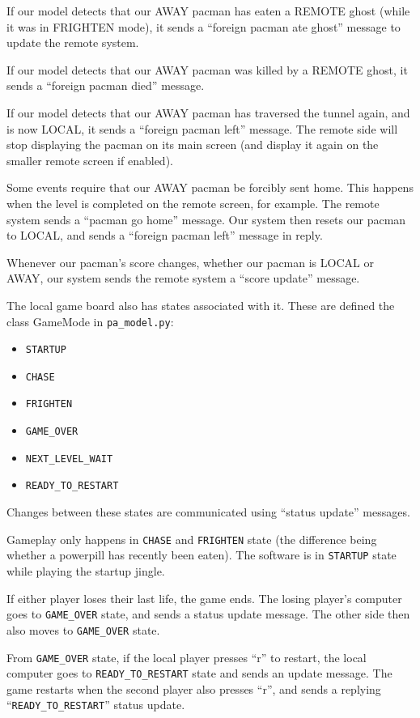 \documentclass{article}
\begin{document}
If our model detects that our AWAY pacman has eaten a REMOTE ghost
 (while it was in FRIGHTEN mode), it sends a ``foreign pacman ate
 ghost'' message to update the remote system.

If our model detects that our AWAY pacman was killed by a REMOTE
ghost, it sends a ``foreign pacman died'' message.

If our model detects that our AWAY pacman has traversed the tunnel
 again, and is now LOCAL, it sends a ``foreign pacman left'' message.
  The remote side will stop displaying the pacman on its main screen
 (and display it again on the smaller remote screen if enabled).

Some events require that our AWAY pacman be forcibly sent home.  This
happens when the level is completed on the remote screen, for example.
The remote system sends a ``pacman go home'' message.  Our system then
resets our pacman to LOCAL, and sends a ``foreign pacman left''
message in reply.

Whenever our pacman's score changes, whether our pacman is LOCAL
or AWAY, our system sends the remote system a ``score update''
message.

The local game board also has states associated with it.  These are defined the class GameMode in {\tt pa\_model.py}:

\begin{itemize}
\item {\tt STARTUP}
\item {\tt CHASE}
\item {\tt FRIGHTEN}
\item {\tt GAME\_OVER}
\item {\tt NEXT\_LEVEL\_WAIT}
\item {\tt READY\_TO\_RESTART}
\end{itemize}

Changes between these states are communicated using ``status update'' messages.

Gameplay only happens in {\tt CHASE} and {\tt FRIGHTEN} state (the difference being
whether a powerpill has recently been eaten).  The software is in
{\tt STARTUP} state while playing the startup jingle.

If either player loses their last life, the game ends.  The losing
player's computer goes to {\tt GAME\_OVER} state, and sends a status update
message.  The other side then also moves to {\tt GAME\_OVER} state.

From {\tt GAME\_OVER} state, if the local player presses ``r'' to restart,
the local computer goes to {\tt READY\_TO\_RESTART} state and sends an update
message.  The game restarts when the second player also presses ``r'',
and sends a replying ``{\tt READY\_TO\_RESTART}'' status update.
\end{document}
